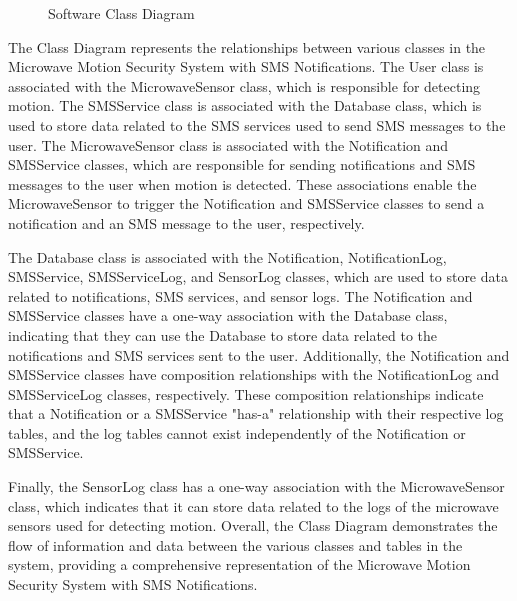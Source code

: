 \documentclass[conference]{IEEEtran}
\begin{document}
\begin{figure}
      \caption{Software Class Diagram}
\end{figure}


The Class Diagram represents the relationships between various classes in the
Microwave Motion Security System with SMS Notifications. The User class is associated
with the MicrowaveSensor class, which is responsible for detecting motion.
The SMSService class is associated with the Database class, which is used to store
data related to the SMS services used to send SMS messages to the user.
The MicrowaveSensor class is associated with the Notification and SMSService classes,
which are responsible for sending notifications and SMS messages to the user when
motion is detected. These associations enable the MicrowaveSensor to trigger the
Notification and SMSService classes to send a notification and an SMS message
to the user, respectively.

The Database class is associated with the Notification, NotificationLog, SMSService,
SMSServiceLog, and SensorLog classes, which are used to store data related to
notifications, SMS services, and sensor logs. The Notification and SMSService
classes have a one-way association with the Database class, indicating that they
can use the Database to store data related to the notifications and SMS services
sent to the user. Additionally, the Notification and SMSService classes have
composition relationships with the NotificationLog and SMSServiceLog classes, respectively.
These composition relationships indicate that a Notification or a SMSService "has-a"
relationship with their respective log tables, and the log tables cannot exist
independently of the Notification or SMSService.

Finally, the SensorLog class has a one-way association with the MicrowaveSensor class,
which indicates that it can store data related to the logs of the microwave sensors
used for detecting motion. Overall, the Class Diagram demonstrates the flow of
information and data between the various classes and tables in the system, providing a
comprehensive representation of the Microwave Motion Security System with
SMS Notifications.
\end{document}
